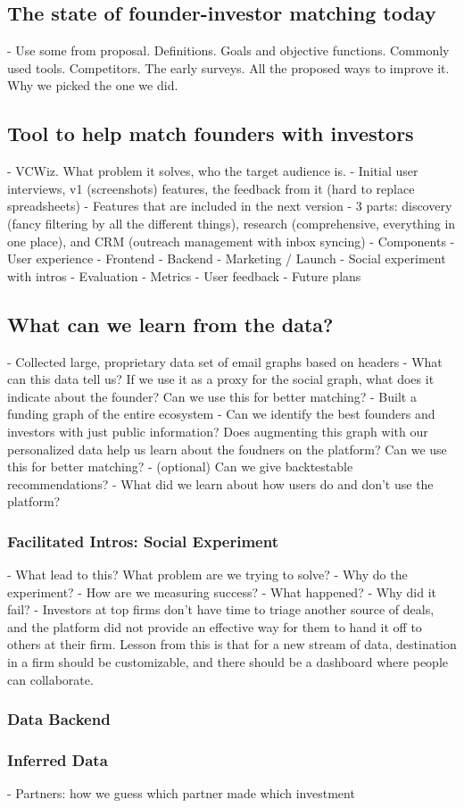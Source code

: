 \subsection{The state of founder-investor matching today}

  - Use some from proposal. Definitions. Goals and objective functions. Commonly used tools. Competitors. The early surveys. All the proposed ways to improve it. Why we picked the one we did.

\subsection{Tool to help match founders with investors}

  - VCWiz. What problem it solves, who the target audience is.
  - Initial user interviews, v1 (screenshots) features, the feedback from it (hard to replace spreadsheets)
  - Features that are included in the next version
    - 3 parts: discovery (fancy filtering by all the different things), research (comprehensive, everything in one place), and CRM (outreach management with inbox syncing)
  - Components
    - User experience
    - Frontend
    - Backend
    - Marketing / Launch
    - Social experiment with intros
  - Evaluation
    - Metrics
    - User feedback
    - Future plans

\subsection{What can we learn from the data?}
  - Collected large, proprietary data set of email graphs based on headers
    - What can this data tell us? If we use it as a proxy for the social graph, what does it indicate about the founder? Can we use this for better matching?
  - Built a funding graph of the entire ecosystem
    - Can we identify the best founders and investors with just public information? Does augmenting this graph with our personalized data help us learn about the foudners on the platform? Can we use this for better matching?
  - (optional) Can we give backtestable recommendations?
  - What did we learn about how users do and don't use the platform?


\subsubsection{Facilitated Intros: Social Experiment}
  - What lead to this? What problem are we trying to solve?
  - Why do the experiment?
  - How are we measuring success?
  - What happened?
  - Why did it fail?
    - Investors at top firms don't have time to triage another source of deals, and the platform did not provide an effective way for them to hand it off to others at their firm. Lesson from this is that for a new stream of data, destination in a firm should be customizable, and there should be a dashboard where people can collaborate.

\subsubsection{Data Backend}

\subsubsection{Inferred Data}

- Partners: how we guess which partner made which investment
